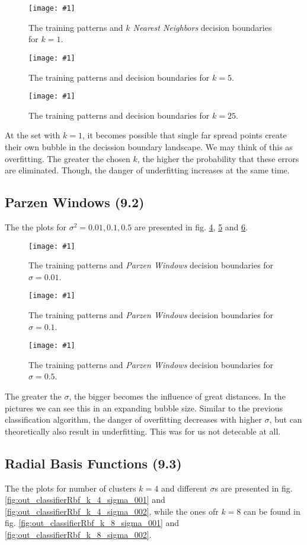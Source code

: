 \documentclass[a4paper,headings=small]{scrartcl}
\newcommand{\image}[3]{
\begin{figure}[htbp]
\centering
\texttt{[image: \#1]}
\caption{#3}
\label{fig:#1}
\end{figure}
}
\begin{document}
\image{out_classifierKnn_k_1}{\classifierPlotWidth}%
	{The training patterns and \emph{$k$ Nearest Neighbors} decision boundaries for $k = 1$.}

\image{out_classifierKnn_k_5}{\classifierPlotWidth}%
	{The training patterns and decision boundaries for $k = 5$.}

\image{out_classifierKnn_k_25}{\classifierPlotWidth}%
	{The training patterns and decision boundaries for $k = 25$.}

At the set with $k = 1$, it becomes possible that single far spread points
create their own bubble in the decission boundary landscape.
We may think of this as overfitting.
The greater the chosen $k$, the higher the probability that these errors are eliminated.
Though, the danger of underfitting increases at the same time.


\subsection{Parzen Windows (9.2)}
The the plots for $\sigma^2 = 0.01, 0.1, 0.5$ are presented in fig.
\ref{fig:out_classifierParzen_sigma2_001},
\ref{fig:out_classifierParzen_sigma2_01} and
\ref{fig:out_classifierParzen_sigma2_05}.

\image{out_classifierParzen_sigma2_001}{\classifierPlotWidth}%
	{The training patterns and \emph{Parzen Windows} decision boundaries for $\sigma = 0.01$.}

\image{out_classifierParzen_sigma2_01}{\classifierPlotWidth}%
	{The training patterns and \emph{Parzen Windows} decision boundaries for $\sigma = 0.1$.}

\image{out_classifierParzen_sigma2_05}{\classifierPlotWidth}%
	{The training patterns and \emph{Parzen Windows} decision boundaries for $\sigma = 0.5$.}

The greater the $\sigma$, the bigger becomes the influence of great distances.
In the pictures we can see this in an expanding bubble size.
Similar to the previous classification algorithm, the danger of overfitting decreases with higher $\sigma$,
but can theoretically also result in underfitting.
This was for us not detecable at all.


\subsection{Radial Basis Functions (9.3)}
The the plots for number of clusters $k = 4$ and different $\sigma$s are presented in fig.
\ref{fig:out_classifierRbf_k_4_sigma_001} and
\ref{fig:out_classifierRbf_k_4_sigma_002},
while the ones ofr $k = 8$ can be found in fig.
\ref{fig:out_classifierRbf_k_8_sigma_001} and
\ref{fig:out_classifierRbf_k_8_sigma_002}.
\end{document}
